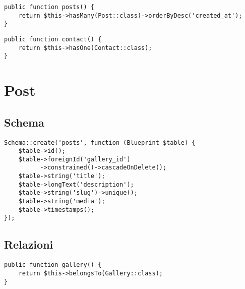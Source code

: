\begin{lstlisting}
public function posts() {
	return $this->hasMany(Post::class)->orderByDesc('created_at');
}
\end{lstlisting}

\begin{lstlisting}
public function contact() {
	return $this->hasOne(Contact::class);
}
\end{lstlisting}

\section{Post}
\subsection{Schema}
\begin{lstlisting}
Schema::create('posts', function (Blueprint $table) {
	$table->id();
	$table->foreignId('gallery_id')
	      ->constrained()->cascadeOnDelete();
	$table->string('title');
	$table->longText('description');
	$table->string('slug')->unique();
	$table->string('media');
	$table->timestamps();
});
\end{lstlisting}
\subsection{Relazioni}
\begin{lstlisting}
public function gallery() {
	return $this->belongsTo(Gallery::class);
}
\end{lstlisting}


